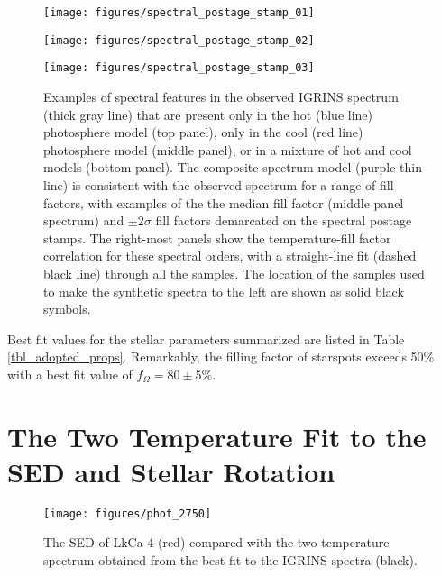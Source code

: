 \documentclass[12pt]{report}
\begin{document}
\begin{figure*}
 \centering
 \texttt{[image: figures/spectral\_postage\_stamp\_01]} 

 \texttt{[image: figures/spectral\_postage\_stamp\_02]} 

 \texttt{[image: figures/spectral\_postage\_stamp\_03]} 
 \caption[Examples of spectral features in the observed IGRINS spectrum]{Examples of spectral features in the observed IGRINS spectrum (thick gray line) that are present only in the hot (blue line) photosphere model (top panel), only in the cool (red line) photosphere model (middle panel), or in a mixture of hot and cool models (bottom panel).  The composite spectrum model (purple thin line) is consistent with the observed spectrum for a range of fill factors, with examples of the the median fill factor (middle panel spectrum) and $\pm2\sigma$ fill factors demarcated on the spectral postage stamps.  The right-most panels show the temperature-fill factor correlation for these spectral orders, with a straight-line fit (dashed black line) through all the samples.  The location of the samples used to make the synthetic spectra to the left are shown as solid black symbols.}
 \label{fig:specPostageStamp}
\end{figure*}

Best fit values for the stellar parameters summarized are listed in Table \ref{tbl_adopted_props}.  Remarkably, the filling factor of starspots exceeds 50\% with a best fit value of $f_{\Omega}=80\pm 5 \% $.




\section{The Two Temperature Fit to the SED and Stellar Rotation}\label{sec:GJHsection4}

\begin{figure}
 \centering
 \texttt{[image: figures/phot\_2750]}
\caption[The SED of LkCa 4]{The SED of LkCa 4 (red) compared with the two-temperature spectrum obtained from the best fit to the IGRINS spectra (black).}
\label{fig:sed}
\end{figure}
\end{document}
